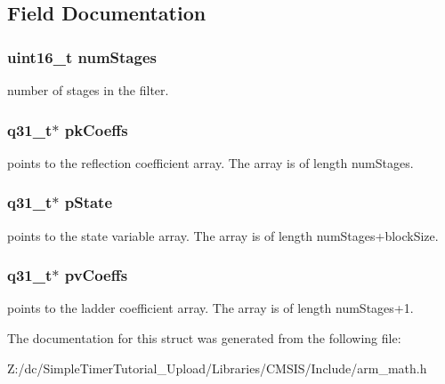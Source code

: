 \subsection{Field Documentation}
\hypertarget{structarm__iir__lattice__instance__q31_a4cceb90547b3e585d4c7aabaa8057212}{
\subsubsection[{num\-Stages}]{\setlength{\rightskip}{0pt plus 5cm}uint16\-\_\-t num\-Stages}}\label{structarm__iir__lattice__instance__q31_a4cceb90547b3e585d4c7aabaa8057212}
number of stages in the filter. \hypertarget{structarm__iir__lattice__instance__q31_a9d45339bf841bf86aec57be5f70d2b01}{
\subsubsection[{pk\-Coeffs}]{\setlength{\rightskip}{0pt plus 5cm}q31\-\_\-t$\ast$ pk\-Coeffs}}\label{structarm__iir__lattice__instance__q31_a9d45339bf841bf86aec57be5f70d2b01}
points to the reflection coefficient array. The array is of length num\-Stages. \hypertarget{structarm__iir__lattice__instance__q31_adee4ba3ee8869865af7d8fa08ca913d6}{
\subsubsection[{p\-State}]{\setlength{\rightskip}{0pt plus 5cm}q31\-\_\-t$\ast$ p\-State}}\label{structarm__iir__lattice__instance__q31_adee4ba3ee8869865af7d8fa08ca913d6}
points to the state variable array. The array is of length num\-Stages+block\-Size. \hypertarget{structarm__iir__lattice__instance__q31_a3d7de56fe9de3458f033a64f14407533}{
\subsubsection[{pv\-Coeffs}]{\setlength{\rightskip}{0pt plus 5cm}q31\-\_\-t$\ast$ pv\-Coeffs}}\label{structarm__iir__lattice__instance__q31_a3d7de56fe9de3458f033a64f14407533}
points to the ladder coefficient array. The array is of length num\-Stages+1. 

The documentation for this struct was generated from the following file\-:\begin{DoxyCompactItemize}
\item 
Z\-:/dc/\-Simple\-Timer\-Tutorial\-\_\-\-Upload/\-Libraries/\-C\-M\-S\-I\-S/\-Include/arm\-\_\-math.\-h\end{DoxyCompactItemize}
